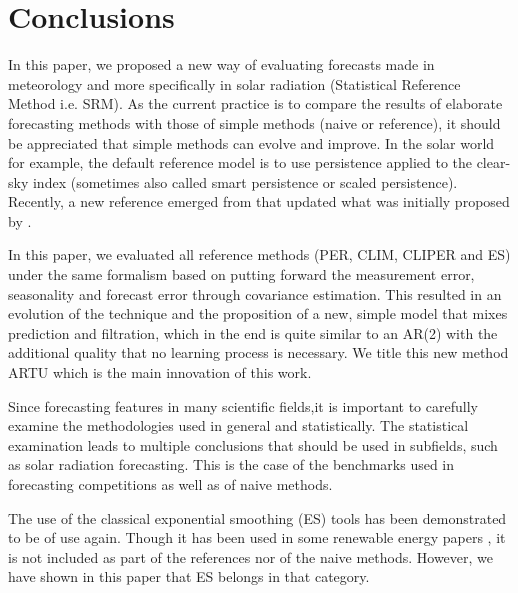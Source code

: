 \section{Conclusions}
\label{sec:conclusion}

In this paper, we proposed a new way of evaluating forecasts made in meteorology and more specifically in solar radiation (Statistical Reference Method i.e. SRM). As the current practice is to compare the results of elaborate forecasting methods with those of simple methods (naive or reference), it should be appreciated that simple methods can evolve and improve. In the solar world for example, the default reference model is to use persistence applied to the clear-sky index (sometimes also called smart persistence or scaled persistence). Recently, a new reference emerged from \cite{YANG2019981} that updated what was initially proposed by \cite{murphy_climatology_1992}. 

In this paper, we evaluated all reference methods (PER, CLIM, CLIPER and ES) under the same formalism based on putting forward the measurement error, seasonality and forecast error through covariance estimation. This resulted in an evolution of the technique and the proposition of a new, simple model that mixes prediction and filtration, which in the end is quite similar to an AR(2) with the additional quality that no learning process is necessary. We title this new method ARTU which is the main innovation of this work. 

Since forecasting features in many scientific fields,it is important to carefully examine the methodologies used in general and statistically. The statistical examination leads to multiple conclusions that should be used in subfields, such as solar radiation forecasting. This is the case of the benchmarks used in forecasting competitions as well as of naive methods. 

The use of the classical exponential smoothing (ES) tools has been demonstrated to be of use again. Though it has been used in some renewable energy papers \citep{DONG20131104}, it is not included as part of the references nor of the naive methods. However, we have shown in this paper that ES belongs in that category.

